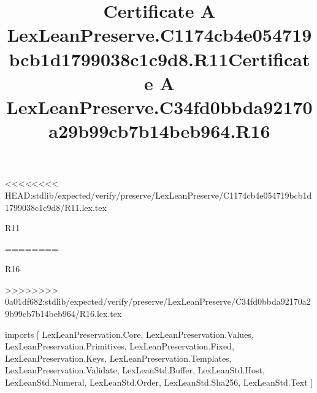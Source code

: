 <<<<<<<< HEAD:stdlib/expected/verify/preserve/LexLeanPreserve/C1174cb4e054719bcb1d1799038c1c9d8/R11.lex.tex
\begin{lexlean}{R11}
\title{Certificate A LexLeanPreserve.C1174cb4e054719bcb1d1799038c1c9d8.R11}
========
\begin{lexlean}{R16}
\title{Certificate A LexLeanPreserve.C34fd0bbda92170a29b99cb7b14beb964.R16}
>>>>>>>> 0a01df682:stdlib/expected/verify/preserve/LexLeanPreserve/C34fd0bbda92170a29b99cb7b14beb964/R16.lex.tex
\begin{coremodule}
imports [
  LexLeanPreservation.Core,
  LexLeanPreservation.Values,
  LexLeanPreservation.Primitives,
  LexLeanPreservation.Fixed,
  LexLeanPreservation.Keys,
  LexLeanPreservation.Templates,
  LexLeanPreservation.Validate,
  LexLeanStd.Buffer,
  LexLeanStd.Host,
  LexLeanStd.Numeral,
  LexLeanStd.Order,
  LexLeanStd.Sha256,
  LexLeanStd.Text
]


\end{coremodule}
\end{lexlean}
\end{lexlean}
